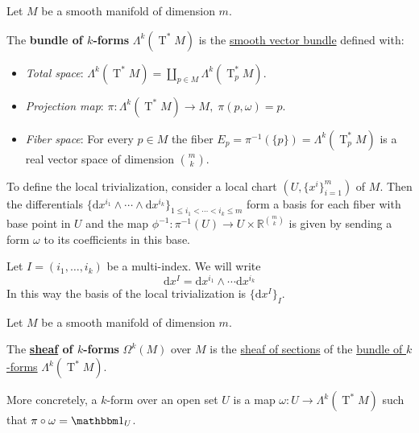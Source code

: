 \documentclass[../../main]{subfiles}
\begin{document}
\begin{definition} \label{def:smooth-k-form-bundle}
  Let \(M\) be a smooth manifold of dimension \(m\).

  The \textbf{bundle of \(k\)-forms} \(\Lambda^{k}(\operatorname{T}^{\ast}M)\) is the \hyperref[def:smooth-vector-bundle]{smooth vector bundle} defined with:
  \begin{itemize}
    \item \textit{Total space}: \(\Lambda^{k}(\operatorname{T}^{\ast}M) = \coprod_{p \in M} \Lambda^{k}(\operatorname{T}_{p}^{\ast}M)\).
    \item \textit{Projection map}: \(\pi: \Lambda^{k}(\operatorname{T}^{\ast}M) \to M,\; \pi(p, \omega) = p\).
    \item \textit{Fiber space}: For every \(p \in M\) the fiber \(E_{p} = \pi^{-1}(\{p\}) = \Lambda^{k}(\operatorname{T}_{p}^{\ast}M)\) is a real vector space of dimension \({m \choose k}\).
  \end{itemize}
  To define the local trivialization, consider a local chart \((U, \{x^{i}\}_{i=1}^{m})\) of \(M\).
  Then the differentials \(\{\mathrm{d}x^{i_{1}} \wedge \cdots \wedge \mathrm{d}x^{i_{k}}\}_{1 \leq i_{1} < \cdots < i_{k} \leq m}\) form a basis for each fiber with base point in \(U\) and the map \(\phi^{-1}: \pi^{-1}(U) \to U \times \mathbb{R}^{{m \choose k}}\) is given by sending a form \(\omega\) to its coefficients in this base.
\end{definition}

\begin{notation}
  Let \(I = (i_{1}, \ldots, i_{k})\) be a multi-index.
  We will write
  \begin{equation*}
    \mathrm{d}x^{I} = \mathrm{d}x^{i_{1}} \wedge \cdots \mathrm{d}x^{i_{k}}
  \end{equation*}
  In this way the basis of the local trivialization is \(\{\mathrm{d}x^{I}\}_{I}\).
\end{notation}


\begin{definition} \label{def:smooth-k-form}
  Let \(M\) be a smooth manifold of dimension \(m\).

  The \textbf{\hyperref[def:sheaf]{sheaf} of \(k\)-forms} \(\Omega^{k}(M)\) over \(M\) is the \hyperref[def:sheaf-of-sections]{sheaf of sections} of the \hyperref[def:smooth-k-form-bundle]{bundle of \(k\)-forms} \(\Lambda^{k}(\operatorname{T}^{\ast}M)\).

  More concretely, a \(k\)-form over an open set \(U\) is a map \(\omega: U \to \Lambda^{k}(\operatorname{T}^{\ast}M)\) such that \(\pi \circ \omega = \id_{U}\).
\end{definition}
\end{document}
